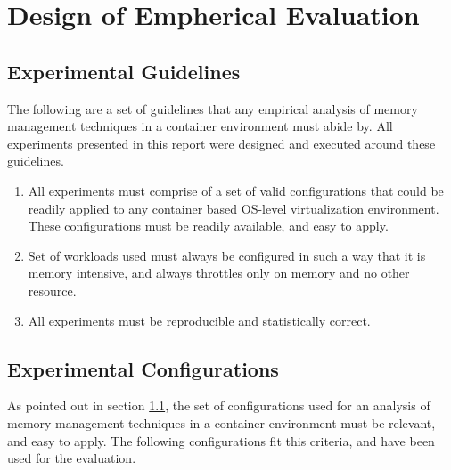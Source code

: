 
\chapter{Design of Empherical Evaluation}

  \section{Experimental Guidelines}
    \label{section_guidelines}
    
    The following are a set of guidelines that any empirical analysis of memory management techniques in a container environment must 
abide by.  All experiments presented in this report were designed and executed around these guidelines.

    \begin{enumerate}
      \item All experiments must comprise of a set of valid configurations that could be readily applied to any container based OS-level 
virtualization environment. These configurations must be readily available, and easy to apply.
      \item Set of workloads used must always be configured in such a way that it is memory intensive, and always throttles only on memory 
and no other resource.
      \item All experiments must be reproducible and statistically correct.      
    \end{enumerate}

  \section{Experimental Configurations}
    
    As pointed out in section \ref{section_guidelines}, the set of configurations used for an analysis of memory management techniques in a 
container environment must be relevant, and easy to apply. The following configurations fit this criteria, and have been used for the 
evaluation.
    
